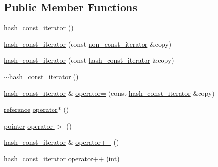\subsection*{Public Member Functions}
\begin{DoxyCompactItemize}
\item 
\hyperlink{classhash__const__iterator_a9d7849cca0346545b845d81702c9026d}{hash\+\_\+const\+\_\+iterator} ()
\item 
\hyperlink{classhash__const__iterator_a48ce80d88956b4dc780648a5d5a37b9e}{hash\+\_\+const\+\_\+iterator} (const \hyperlink{classhash__const__iterator_ab4441e734185e334b2b02f49f83af048}{non\+\_\+const\+\_\+iterator} \&copy)
\item 
\hyperlink{classhash__const__iterator_a45e2d1b0ac4407e09301081686cdc3e8}{hash\+\_\+const\+\_\+iterator} (const \hyperlink{classhash__const__iterator}{hash\+\_\+const\+\_\+iterator} \&copy)
\item 
\hyperlink{classhash__const__iterator_a4fec3f3c7a94105bb94ee2a5752d372d}{$\sim$hash\+\_\+const\+\_\+iterator} ()
\item 
\hyperlink{classhash__const__iterator}{hash\+\_\+const\+\_\+iterator} \& \hyperlink{classhash__const__iterator_a1448bd01ba140cf497304e4be1d550e0}{operator=} (const \hyperlink{classhash__const__iterator}{hash\+\_\+const\+\_\+iterator} \&copy)
\item 
\hyperlink{classhash__const__iterator_a9634442043c96c628889101cc7e5639d}{reference} \hyperlink{classhash__const__iterator_ac38c2489078b1faae9c7d6989734ac30}{operator$\ast$} ()
\item 
\hyperlink{classhash__const__iterator_a3a6d2d49ab869df674b9b0e828117fe4}{pointer} \hyperlink{classhash__const__iterator_a8b1f3a54dde4fc0a00cce6b249f5bc75}{operator-\/$>$} ()
\item 
\hyperlink{classhash__const__iterator}{hash\+\_\+const\+\_\+iterator} \& \hyperlink{classhash__const__iterator_a122d7d57e8e4338ed5b64722fe51d5b0}{operator++} ()
\item 
\hyperlink{classhash__const__iterator}{hash\+\_\+const\+\_\+iterator} \hyperlink{classhash__const__iterator_a6c36536c07f970106626ef00c3ad4e33}{operator++} (int)
\end{DoxyCompactItemize}
